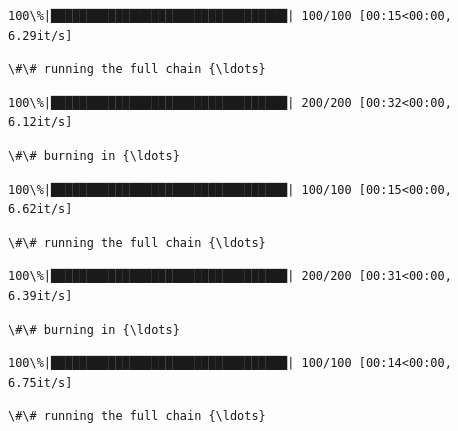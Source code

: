 \documentclass[11pt]{article}
\begin{document}
    \begin{Verbatim}[commandchars=\\\{\}]
100\%|█████████████████████████████████| 100/100 [00:15<00:00,  6.29it/s]
    \end{Verbatim}

    \begin{Verbatim}[commandchars=\\\{\}]
\#\# running the full chain {\ldots}
    \end{Verbatim}

    \begin{Verbatim}[commandchars=\\\{\}]
100\%|█████████████████████████████████| 200/200 [00:32<00:00,  6.12it/s]
    \end{Verbatim}

    \begin{Verbatim}[commandchars=\\\{\}]
\#\# burning in {\ldots}
    \end{Verbatim}

    \begin{Verbatim}[commandchars=\\\{\}]
100\%|█████████████████████████████████| 100/100 [00:15<00:00,  6.62it/s]
    \end{Verbatim}

    \begin{Verbatim}[commandchars=\\\{\}]
\#\# running the full chain {\ldots}
    \end{Verbatim}

    \begin{Verbatim}[commandchars=\\\{\}]
100\%|█████████████████████████████████| 200/200 [00:31<00:00,  6.39it/s]
    \end{Verbatim}

    \begin{Verbatim}[commandchars=\\\{\}]
\#\# burning in {\ldots}
    \end{Verbatim}

    \begin{Verbatim}[commandchars=\\\{\}]
100\%|█████████████████████████████████| 100/100 [00:14<00:00,  6.75it/s]
    \end{Verbatim}

    \begin{Verbatim}[commandchars=\\\{\}]
\#\# running the full chain {\ldots}
    \end{Verbatim}
\end{document}
